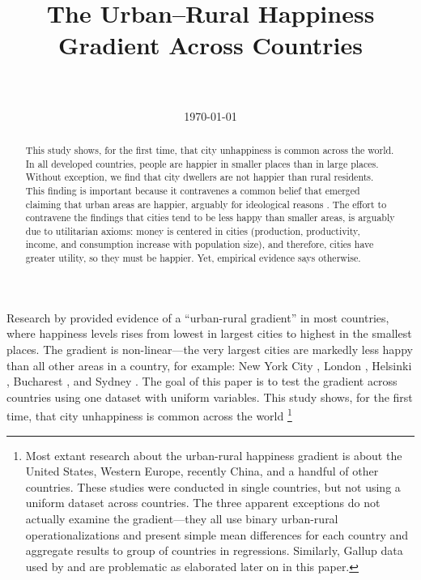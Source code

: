 \documentclass[10pt, letterpaper]{article}
\date{{}\today  \hspace{.2in}\xxivtime}
\title{  %
The Urban--Rural Happiness Gradient Across Countries\\
\\ 
}
\author{
}
\begin{document}


\maketitle
\vspace{-.4in}
\begin{center}

\end{center}


\begin{abstract}
This study shows, for the first time, that city unhappiness is 
common across the world. In all developed countries, people are happier in smaller places than in large places. Without exception, we find that city dwellers are not happier than rural residents. This finding is important because it contravenes a common belief that emerged claiming that urban areas are happier, arguably for ideological reasons \citep[e.g.,][]{glaeser11,glaeser14,burger20}. The effort to contravene the findings that cities tend to be less happy than smaller areas, is arguably due to utilitarian axioms: money is centered in cities (production, productivity, income, and consumption increase with population size), and therefore, cities have greater utility, so they must be happier. Yet, empirical evidence says otherwise. 
\end{abstract}
\vspace{.15in} 
\noindent{\sc %
}
\vspace{.25in} 

Research by \cite{aok11a} provided evidence of a ``urban-rural gradient'' in most countries, where happiness levels rises from lowest in largest cities to highest in the smallest places. The gradient is non-linear---the very largest cities are markedly less happy than all other areas in a country, for example: New York City \citep{aok_brfss_city_cize16,senior_ny_sep16_14}, London \citep{ons11,ibt13}, Helsinki \citep{morrison15}, Bucharest \citep{lenzi16D}, and Sydney \citep[cited in][]{morrison11}.
The goal of this paper is to test the gradient across countries using one dataset with uniform variables. This study shows, for the first time, that city unhappiness is common across the world \footnote{Most extant research about the urban-rural happiness gradient is about the United States, Western Europe, recently China, and a handful of other countries. These studies were conducted in single countries, but not using a uniform dataset across countries. The three apparent exceptions \citep{aokcities,burger20,easterlin10al} do not actually examine the gradient---they all use binary urban-rural operationalizations and present simple mean differences for each country and aggregate results to group of countries in regressions. Similarly, Gallup data used by \citet{burger20} and \citet{easterlin10al} are problematic as elaborated later on in this paper.}
 
\end{document}
